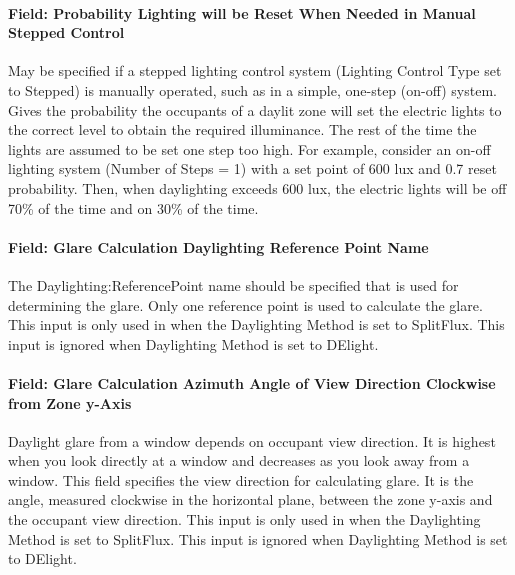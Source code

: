 \paragraph{Field: Probability Lighting will be Reset When Needed in Manual Stepped Control}\label{field-probability-lighting-will-be-reset-when-needed-in-manual-stepped-control}

May be specified if a stepped lighting control system (Lighting Control Type set to Stepped) is manually operated, such as in a simple, one-step (on-off) system. Gives the probability the occupants of a daylit zone will set the electric lights to the correct level to obtain the required illuminance. The rest of the time the lights are assumed to be set one step too high. For example, consider an on-off lighting system (Number of Steps = 1) with a set point of 600 lux and 0.7 reset probability. Then, when daylighting exceeds 600 lux, the electric lights will be off 70\% of the time and on 30\% of the time.

\paragraph{Field: Glare Calculation Daylighting Reference Point Name}\label{field-glare calculation-daylighting-reference-point-name}

The Daylighting:ReferencePoint name should be specified that is used for determining the glare. Only one reference point is used to calculate the glare. This input is only used in when the Daylighting Method is set to SplitFlux. This input is ignored when Daylighting Method is set to DElight.

\paragraph{Field: Glare Calculation Azimuth Angle of View Direction Clockwise from Zone y-Axis}\label{field-glare-calculation-azimuth-angle-of-view-direction-clockwise-from-zone-y-axis}

Daylight glare from a window depends on occupant view direction. It is highest when you look directly at a window and decreases as you look away from a window. This field specifies the view direction for calculating glare. It is the angle, measured clockwise in the horizontal plane, between the zone y-axis and the occupant view direction. This input is only used in when the Daylighting Method is set to SplitFlux. This input is ignored when Daylighting Method is set to DElight.

